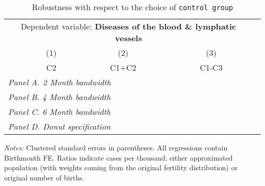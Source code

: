  \begin{table}[H] \begin{threeparttable} \centering \caption{Robustness with respect to the choice of \texttt{control group}} {\def\sym#1{\ifmmode^{#1}\else\(^{#1}\)\fi} \begin{tabular}{l*{4}{c}} \toprule \multicolumn{4}{c}{Dependent variable: \textbf{Diseases of the blood \& lymphatic vessels}} \\ \cmidrule(lr){2-4}
            &\multicolumn{1}{c}{(1)}&\multicolumn{1}{c}{(2)}&\multicolumn{1}{c}{(3)}\\
            &\multicolumn{1}{c}{C2}&\multicolumn{1}{c}{C1+C2}&\multicolumn{1}{c}{C1-C3}\\
\midrule
 \multicolumn{4}{l}{\emph{Panel A. 2 Month bandwidth}} \\    \midrule\multicolumn{4}{l}{\emph{Panel B. 4 Month bandwidth}} \\    \midrule\multicolumn{4}{l}{\emph{Panel C. 6 Month bandwidth}} \\    \midrule\multicolumn{4}{l}{\emph{Panel D. Donut specification}} \\    
\bottomrule \end{tabular} } \begin{tablenotes} \item \scriptsize \emph{Notes:} Clustered standard errors in parentheses. All regressions contain Birthmonth FE. Ratios indicate cases per thousand; either approximated population (with weights coming from the original fertility distribution) or original number of births. \end{tablenotes} \end{threeparttable} \end{table} 
